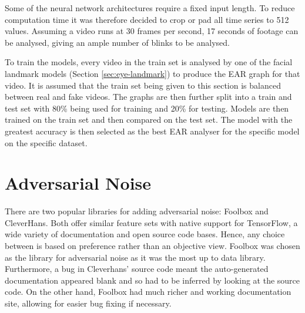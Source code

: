 Some of the neural network architectures require a fixed input length. To reduce computation time it was therefore decided to crop or pad all time series to 512 values. Assuming a video runs at 30 frames per second, 17 seconds of footage can be analysed, giving an ample number of blinks to be analysed.

To train the models, every video in the train set is analysed by one of the facial landmark models (Section \ref{sec:eye-landmark}) to produce the EAR graph for that video. It is assumed that the train set being given to this section is balanced between real and fake videos. The graphs are then further split into a train and test set with 80\% being used for training and 20\% for testing. Models are then trained on the train set and then compared on the test set. The model with the greatest accuracy is then selected as the best EAR analyser for the specific model on the specific dataset.

\section{Adversarial Noise}


There are two popular libraries for adding adversarial noise: Foolbox\cite{rauber2017foolbox}\cite{rauber2017foolboxnative} and CleverHans\cite{papernot2018cleverhans}. Both offer similar feature sets with native support for TensorFlow, a wide variety of documentation and open source code bases. Hence, any choice between is based on preference rather than an objective view. Foolbox was chosen as the library for adversarial noise as it was the most up to data library. Furthermore, a bug in Cleverhans' source code meant the auto-generated documentation appeared blank and so had to be inferred by looking at the source code. On the other hand, Foolbox had much richer and working documentation site, allowing for easier bug fixing if necessary.

